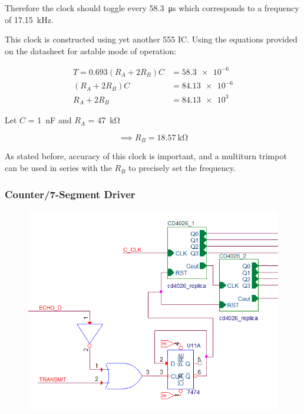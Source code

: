 \documentclass[12pt, a4paper]{article}
\begin{document}
                \noindent Therefore the clock should toggle every \SI{58.3}{\micro\second} which corresponds to a frequency of \SI{17.15}{\kilo\hertz}. 

                \bigskip
                \noindent This clock is constructed using yet another 555 IC. Using the equations provided on the datasheet for astable mode of operation:
                
                \begin{equation}\begin{aligned}
                    T = 0.693(R_A + 2R_B)C &= \num{58.3e-6} \\
                            (R_A + 2R_B)C &= \num{84.13e-6} \\
                            R_A + 2R_B   &= \num{84.13e3}
                \end{aligned}\end{equation}

                \noindent Let $C$ = \SI{1}{\nano\farad} and $R_A$ = \SI{47}{\kilo\ohm}

                \begin{equation}
                    \implies R_B = \SI{18.57}{\kilo\ohm} 
                \end{equation}

                \noindent As stated before, accuracy of this clock is important, and a multiturn trimpot can be used in series with the $R_B$ to precisely set the frequency.

            \subsubsection{Counter/7-Segment Driver}

                \begin{figure}[H]\centering
                    \includegraphics[width=\textwidth]{schematics/counter.png}
                    \caption[]{}
                \end{figure}
\end{document}
